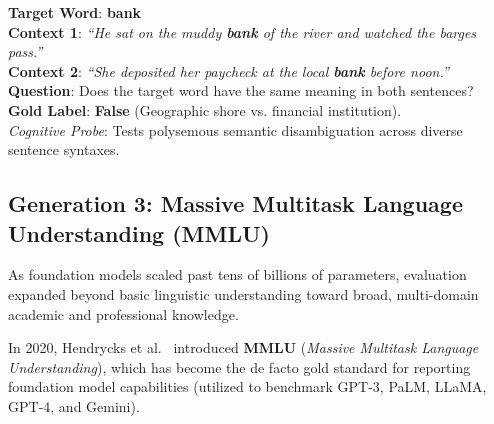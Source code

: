 \documentclass[../../../main.tex]{subfiles}
\begin{document}
\begin{center}
\begin{minipage}{0.95\textwidth}
\begin{tcolorbox}[colback=cardBg,colframe=cardLine,arc=2pt,boxrule=0.5pt,title=\textbf{SuperGLUE Benchmark Example: Words in Context (WiC)}]
\small\sffamily
\textbf{Target Word}: \textbf{bank} \\
\textbf{Context 1}: \textit{``He sat on the muddy \textbf{bank} of the river and watched the barges pass.''} \\
\textbf{Context 2}: \textit{``She deposited her paycheck at the local \textbf{bank} before noon.''} \\
\textbf{Question}: Does the target word have the same meaning in both sentences? \\
\textbf{Gold Label}: \textbf{False} (Geographic shore vs. financial institution). \\
\textit{Cognitive Probe}: Tests polysemous semantic disambiguation across diverse sentence syntaxes.
\end{tcolorbox}
\end{minipage}
\end{center}

\subsection{Generation 3: Massive Multitask Language Understanding (MMLU)}
\label{subsec:mmlu}

As foundation models scaled past tens of billions of parameters, evaluation expanded beyond basic linguistic understanding toward broad, multi-domain academic and professional knowledge.

In 2020, Hendrycks et al.~\cite{hendrycks2020mmlu} introduced \textbf{MMLU} (\textit{Massive Multitask Language Understanding}), which has become the de facto gold standard for reporting foundation model capabilities (utilized to benchmark GPT-3, PaLM, LLaMA, GPT-4, and Gemini).
\end{document}

